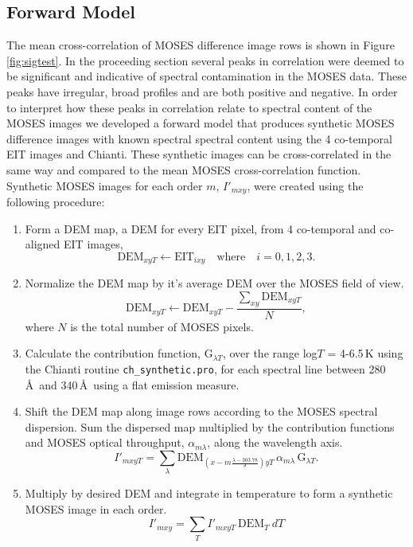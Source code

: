 	\subsection{Forward Model}\label{sec:fomod}
		The mean cross-correlation of MOSES difference image rows is shown in Figure \ref{fig:sigtest}.  
		In the proceeding section  several peaks in correlation were deemed to be significant and indicative of spectral contamination in the MOSES  data.  
		These peaks have irregular, broad profiles and are both positive and negative.  
		In order to interpret how these peaks in correlation relate to spectral content of the MOSES images we developed a forward model that produces synthetic MOSES difference images with known spectral spectral content using the 4 co-temporal EIT images and Chianti.
		These synthetic images can be cross-correlated in the same way and compared to the mean MOSES cross-correlation function. 
		Synthetic MOSES images for each order $m$, $I'_{mxy}$, were created using the following procedure:
			\begin{enumerate}
				\item Form a DEM map, a DEM for every EIT pixel, from 4 co-temporal and co-aligned EIT images,
					\begin{equation}
						\text{DEM}_{xyT} \leftarrow \text{EIT}_{ixy} \quad \text{where} \quad i = 0, 1, 2, 3.
					\end{equation}
					
				\item Normalize the DEM map by it's average DEM over the MOSES field of view.
					\begin{equation}
						\text{DEM}_{xyT} \leftarrow \text{DEM}_{xyT} - \frac{\sum_{xy}\text{DEM}_{xyT} }{N}, 
					\end{equation}
				where $N$ is the total number of MOSES pixels.
				
				\item Calculate the contribution function, G$_{\lambda T}$, over the range log$T$ = 4-6.5\,K  using the Chianti routine \texttt{ch\_synthetic.pro}, for each spectral line between 280\,\AA \ and 340\,\AA\ using a flat emission measure.
				
				\item Shift the DEM map along image rows according to the MOSES spectral dispersion. Sum the dispersed map multiplied by the contribution functions and MOSES optical throughput, $\alpha_{m\lambda}$, along the wavelength axis.
					\begin{equation}
						I'_{mxyT} = \sum_{\lambda}\text{DEM}_{(x-m\frac{\lambda - 303.78}{\delta})yT}\, \alpha_{m\lambda} \, \text{G}_{\lambda T}.
					\end{equation}	
				
				\item Multiply by desired DEM and integrate in temperature to form a synthetic MOSES image in each order. 
					\begin{equation}
						I'_{mxy} = \sum_{T} I'_{mxyT}\, \text{DEM}_T\ dT
					\end{equation}
			\end{enumerate} 
		
